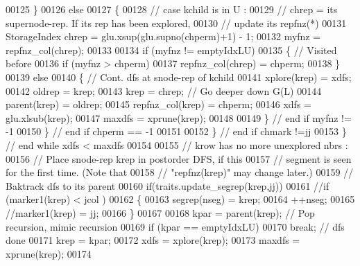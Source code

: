\begin{DoxyCode}
00125             \}
00126             \textcolor{keywordflow}{else}
00127             \{
00128               \textcolor{comment}{// case kchild is in U :}
00129               \textcolor{comment}{// chrep = its supernode-rep. If its rep has been explored, }
00130               \textcolor{comment}{// update its repfnz(*)}
00131               StorageIndex chrep = glu.xsup(glu.supno(chperm)+1) - 1; 
00132               myfnz = repfnz\_col(chrep); 
00133               
00134               \textcolor{keywordflow}{if} (myfnz != emptyIdxLU) 
00135               \{ \textcolor{comment}{// Visited before }
00136                 \textcolor{keywordflow}{if} (myfnz > chperm) 
00137                   repfnz\_col(chrep) = chperm; 
00138               \}
00139               \textcolor{keywordflow}{else} 
00140               \{ \textcolor{comment}{// Cont. dfs at snode-rep of kchild}
00141                 xplore(krep) = xdfs; 
00142                 oldrep = krep; 
00143                 krep = chrep; \textcolor{comment}{// Go deeper down G(L)}
00144                 parent(krep) = oldrep; 
00145                 repfnz\_col(krep) = chperm; 
00146                 xdfs = glu.xlsub(krep); 
00147                 maxdfs = xprune(krep); 
00148                 
00149               \} \textcolor{comment}{// end if myfnz != -1}
00150             \} \textcolor{comment}{// end if chperm == -1 }
00151                 
00152           \} \textcolor{comment}{// end if chmark !=jj}
00153         \} \textcolor{comment}{// end while xdfs < maxdfs}
00154         
00155         \textcolor{comment}{// krow has no more unexplored nbrs :}
00156         \textcolor{comment}{//    Place snode-rep krep in postorder DFS, if this }
00157         \textcolor{comment}{//    segment is seen for the first time. (Note that }
00158         \textcolor{comment}{//    "repfnz(krep)" may change later.)}
00159         \textcolor{comment}{//    Baktrack dfs to its parent}
00160         \textcolor{keywordflow}{if}(traits.update\_segrep(krep,jj))
00161         \textcolor{comment}{//if (marker1(krep) < jcol )}
00162         \{
00163           segrep(nseg) = krep; 
00164           ++nseg; 
00165           \textcolor{comment}{//marker1(krep) = jj; }
00166         \}
00167         
00168         kpar = parent(krep); \textcolor{comment}{// Pop recursion, mimic recursion }
00169         \textcolor{keywordflow}{if} (kpar == emptyIdxLU) 
00170           \textcolor{keywordflow}{break}; \textcolor{comment}{// dfs done }
00171         krep = kpar; 
00172         xdfs = xplore(krep); 
00173         maxdfs = xprune(krep); 
00174 

\end{DoxyCode}
